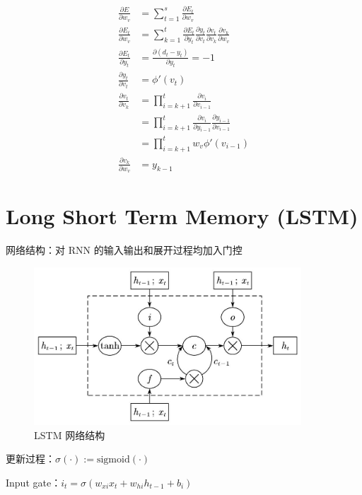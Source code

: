 \documentclass[openany,a4paper,12pt]{ctexbook}
\theoremstyle{kaiti}
\theoremstyle{normal}
\begin{document}
\begin{equation}
\begin{aligned}
  \frac{\partial E}{\partial w_v}&=\sum_{t=1}^s{\frac{\partial E_t}{\partial w_v}} \\
  \frac{\partial E_t}{\partial w_v}&=\sum_{k=1}^t{\frac{\partial E_t}{\partial y_t}\frac{\partial y_t}{\partial v_t}\frac{\partial v_t}{\partial v_k}\frac{\partial v_k}{\partial w_v}}\\
  \frac{\partial E_t}{\partial y_t}&=\frac{\partial \left(d_t-y_t \right)}{\partial y_t}=-1 \\
  \frac{\partial y_t}{\partial v_t}&=\phi '\left(v_t \right) \\
  \frac{\partial v_t}{\partial v_k}
  &=\prod_{i=k+1}^t{\frac{\partial v_i}{\partial v_{i-1}}}\\
  &=\prod_{i=k+1}^t{\frac{\partial v_i}{\partial y_{i-1}}\frac{\partial y_{i-1}}{\partial v_{i-1}}}\\
  &=\prod_{i=k+1}^t{w_v\phi '\left(v_{i-1} \right)}\\
  \frac{\partial v_k}{\partial w_v}&=y_{k-1}
\end{aligned}
\end{equation}

\section{Long Short Term Memory (LSTM)}

网络结构：对 RNN 的输入输出和展开过程均加入门控

\begin{figure}
  \centering
  \includegraphics[width=10cm]{1627808642695-8.4.jpg}
  \caption{LSTM 网络结构}
\end{figure}

更新过程：$\sigma \left(\cdot \right):=\mathrm{sigmoid}\left(\cdot \right)$

Input gate：$i_t=\sigma \left(w_{xi}x_t+w_{hi}h_{t-1}+b_i \right)$
\end{document}
